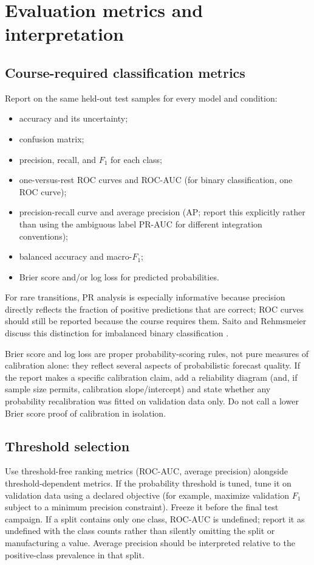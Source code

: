 \documentclass[11pt,a4paper]{article}
\begin{document}
\section{Evaluation metrics and interpretation}
\label{sec:metrics}

\subsection{Course-required classification metrics}

Report on the same held-out test samples for every model and condition:
\begin{itemize}
  \item accuracy and its uncertainty;
  \item confusion matrix;
  \item precision, recall, and $F_1$ for each class;
  \item one-versus-rest ROC curves and ROC-AUC (for binary classification, one ROC curve);
  \item precision-recall curve and average precision (AP; report this explicitly rather than using the ambiguous label PR-AUC for different integration conventions);
  \item balanced accuracy and macro-$F_1$;
  \item Brier score and/or log loss for predicted probabilities.
\end{itemize}

For rare transitions, PR analysis is especially informative because precision directly reflects the fraction of positive predictions that are correct; ROC curves should still be reported because the course requires them. Saito and Rehmsmeier discuss this distinction for imbalanced binary classification \cite{Saito2015}.

Brier score and log loss are proper probability-scoring rules, not pure measures of calibration alone: they reflect several aspects of probabilistic forecast quality. If the report makes a specific calibration claim, add a reliability diagram (and, if sample size permits, calibration slope/intercept) and state whether any probability recalibration was fitted on validation data only. Do not call a lower Brier score proof of calibration in isolation.

\subsection{Threshold selection}

Use threshold-free ranking metrics (ROC-AUC, average precision) alongside threshold-dependent metrics. If the probability threshold is tuned, tune it on validation data using a declared objective (for example, maximize validation $F_1$ subject to a minimum precision constraint). Freeze it before the final test campaign. If a split contains only one class, ROC-AUC is undefined; report it as undefined with the class counts rather than silently omitting the split or manufacturing a value. Average precision should be interpreted relative to the positive-class prevalence in that split.
\end{document}
